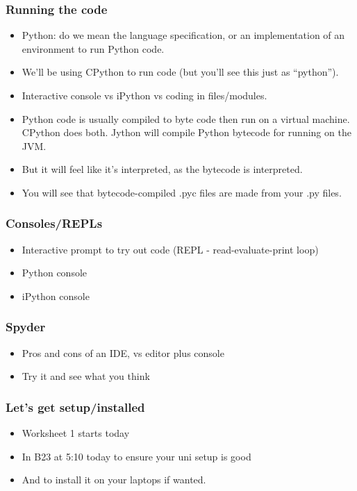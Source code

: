 \documentclass{beamer}
\begin{document}
\begin{frame}
\frametitle{Running the code}
\begin{itemize}
\item Python: do we mean the language specification, or an implementation of an
  environment to run Python code.
\item We'll be using CPython to run code (but you'll see this just as ``python'').
\item Interactive console vs iPython vs coding in files/modules.
\item Python code is usually compiled to byte code then run on a virtual
  machine. CPython does both.  Jython will compile Python bytecode for
  running on the JVM.
\item But it will feel like it's interpreted, as the bytecode is
  interpreted. 
\item You will see that bytecode-compiled .pyc files are made
  from your .py files.
\end{itemize}
\end{frame}


\begin{frame}
\frametitle{Consoles/REPLs}
\begin{itemize}
\item Interactive prompt to try out code (REPL - read-evaluate-print
  loop)
\item Python console 
\item iPython console
\end{itemize}
\end{frame}


\begin{frame}
\frametitle{Spyder}
\begin{itemize}
\item Pros and cons of an IDE, vs editor plus console
\item Try it and see what you think
\end{itemize}
\end{frame}




\begin{frame}
\frametitle{Let's get setup/installed}
\begin{itemize}
\item Worksheet 1 starts today
\item In B23 at 5:10 today to ensure your uni setup is good 
\item And to install it on your laptops if wanted.
\end{itemize}
\end{frame}
\end{document}
